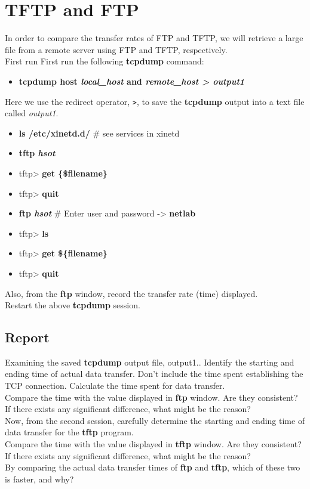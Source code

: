 \documentclass[10pt,a4paper]{article}
\numberwithin{equation}{section}
\numberwithin{figure}{section}
\numberwithin{table}{section}
\begin{document}
\section{TFTP and FTP}
	In order to compare the transfer rates of FTP and TFTP, we will retrieve a large file from a remote server using FTP and TFTP, respectively.\\
	First run First run the following \textbf{tcpdump} command:
	\begin{itemize}
		\item \textbf{tcpdump host \textit{local\_host} and \textit{remote\_host > output1}}
	\end{itemize}
	Here we use the redirect operator, \texttt{>}, to save the \textbf{tcpdump} output into a text file called \textit{output1}.
	\begin{itemize}			
		\item \textbf{ls /etc/xinetd.d/} \# see services in xinetd
		\item \textbf{tftp \textit{hsot}}
		\item tftp> \textbf{get \{\$filename\}}
		\item tftp> \textbf{quit}
		\item \textbf{ftp \textit{hsot}} \# Enter user and password -> \textbf{netlab}
		\item tftp> \textbf{ls}
		\item tftp> \textbf{get \$\{filename\}}
		\item tftp> \textbf{quit}
	\end{itemize}
	Also, from the \textbf{ftp} window, record the transfer rate (time) displayed. \\
	Restart the above \textbf{tcpdump} session.

	\subsection*{Report}
	Examining the saved \textbf{tcpdump} output file, output1.. Identify the starting and ending time of actual data transfer.
	Don’t include the time spent establishing the TCP connection.
	Calculate the time spent for data transfer. \\
	Compare the time with the value displayed in \textbf{ftp} window.
	Are they consistent?
	If there exists any significant difference, what might be the reason? \\
	Now, from the second session, carefully determine the starting and ending time of data transfer for the \textbf{tftp} program. \\
	Compare the time with the value displayed in \textbf{tftp} window.
	Are they consistent?
	If there exists any significant difference, what might be the reason? \\
	By comparing the actual data transfer times of \textbf{ftp} and \textbf{tftp}, which of these two is faster, and why?
\end{document}
